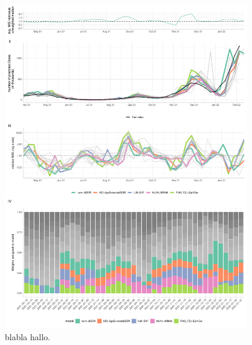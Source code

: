 \begin{figure}
\centering
\includegraphics[width = 0.95\textwidth]{../plots/best_performers_weights_de}
\caption{blabla hallo.}
\label{fig:bpweights_de}
\end{figure}
